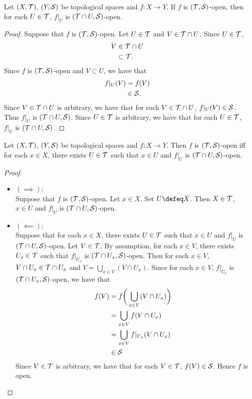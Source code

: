 \documentclass{book}
\begin{document}
\begin{ex} 
	Let $(X, \mathcal{T})$, $(Y, \mathcal{S})$ be topological spaces and $f:X \rightarrow Y$. If $f$ is $(\mathcal{T}, \mathcal{S})$-open, then for each $U \in \mathcal{T}$, $f|_U$ is $(\mathcal{T} \cap U, \mathcal{S})$-open.
\end{ex}

\begin{proof}
	Suppose that $f$ is $(\mathcal{T}, \mathcal{S})$-open. Let $U \in \mathcal{T}$ and $V \in \mathcal{T} \cap U$. Since $U \in \mathcal{T}$, 
	\begin{align*}
		V
		& \in \mathcal{T} \cap U \\
		& \subset \mathcal{T}. 
	\end{align*}
	Since $f$ is $(\mathcal{T}, \mathcal{S})$-open and $V \subset U$, we have that 
	\begin{align*}
		f|_U(V)
		& = f(V) \\
		& \in \mathcal{S}.
	\end{align*}
	Since $V \in \mathcal{T} \cap U$ is arbitrary, we have that for each $V \in \mathcal{T} \cap U$, $f|_U(V) \in \mathcal{S}$. Thus $f|_U$ is $(\mathcal{T} \cap U, \mathcal{S})$. Since $U \in \mathcal{T}$ is arbitrary, we have that for each $U \in \mathcal{T}$, $f|_U$ is $(\mathcal{T} \cap U, \mathcal{S})$. 
\end{proof}

\begin{ex} 
	Let $(X, \mathcal{T})$, $(Y, \mathcal{S})$ be topological spaces and $f:X \rightarrow Y$. Then $f$ is $(\mathcal{T}, \mathcal{S})$-open iff for each $x \in X$, there exists $U \in \mathcal{T}$ such that $x \in U$ and $f|_U$ is $(\mathcal{T} \cap U, \mathcal{S})$-open.
\end{ex}

\begin{proof}\
	\begin{itemize}
		\item $(\implies)$: \\ 
		Suppose that $f$ is $(\mathcal{T}, \mathcal{S})$-open. Let $x \in X$. Set $U \defeq X$. Then $X \in \mathcal{T}$, $x \in U$ and $f|_U$ is $(\mathcal{T} \cap U, \mathcal{S})$-open. 
		\item $(\impliedby):$ \\
		Suppose that for each $x \in X$, there exists $U \in \mathcal{T}$ such that $x \in U$ and $f|_U$ is $(\mathcal{T} \cap U, \mathcal{S})$-open. Let $V \in \mathcal{T}$. By assumption, for each $x \in V$, there exists $U_x \in \mathcal{T}$ such that $f|_{U_x}$ is $(\mathcal{T} \cap U_x, \mathcal{S})$-open. Then for each $x \in V$, $V \cap U_x \in \mathcal{T} \cap U_x$ and $V = \bigcup\limits_{x \in V} (V \cap U_x)$. Since for each $x \in V$, $f|_{U_x}$ is $(\mathcal{T} \cap U_x, \mathcal{S})$-open, we have that 
		\begin{align*}
			f(V)
			& = f \bigg( \bigcup_{x \in V} (V \cap U_x) \bigg) \\
			& = \bigcup_{x \in V} f (V \cap U_x) \\
			& = \bigcup_{x \in V} f|_{U_x}(V \cap U_x) \\
			& \in \mathcal{S}
		\end{align*}
		Since $V \in \mathcal{T}$ is arbitrary, we have that for each $V \in \mathcal{T}$, $f(V) \in \mathcal{S}$. Hence $f$ is open.
	\end{itemize}
\end{proof}
\end{document}
